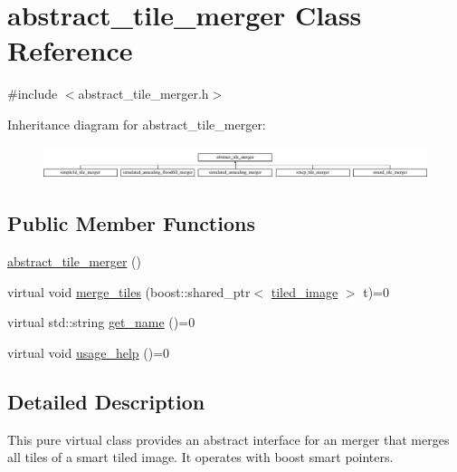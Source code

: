 \hypertarget{classabstract__tile__merger}{\section{abstract\-\_\-tile\-\_\-merger Class Reference}
\label{classabstract__tile__merger}
}


{\ttfamily \#include $<$abstract\-\_\-tile\-\_\-merger.\-h$>$}

Inheritance diagram for abstract\-\_\-tile\-\_\-merger\-:\begin{figure}[H]
\begin{center}
\leavevmode
\includegraphics[height=0.978166cm]{classabstract__tile__merger}
\end{center}
\end{figure}
\subsection*{Public Member Functions}
\begin{DoxyCompactItemize}
\item 
\hyperlink{classabstract__tile__merger_a69c603d54ddfaf3346713756bfceaab5}{abstract\-\_\-tile\-\_\-merger} ()
\item 
virtual void \hyperlink{classabstract__tile__merger_a52ab494f77e495ab1a59b49e49c98db4}{merge\-\_\-tiles} (boost\-::shared\-\_\-ptr$<$ \hyperlink{classtiled__image}{tiled\-\_\-image} $>$ t)=0
\item 
virtual std\-::string \hyperlink{classabstract__tile__merger_a12ec9d118912b3c571d61ff9649042c6}{get\-\_\-name} ()=0
\item 
virtual void \hyperlink{classabstract__tile__merger_a7922b65624d12ef2d6c115218d2378b4}{usage\-\_\-help} ()=0
\end{DoxyCompactItemize}


\subsection{Detailed Description}
This pure virtual class provides an abstract interface for an merger that merges all tiles of a smart tiled image. It operates with boost smart pointers. 

